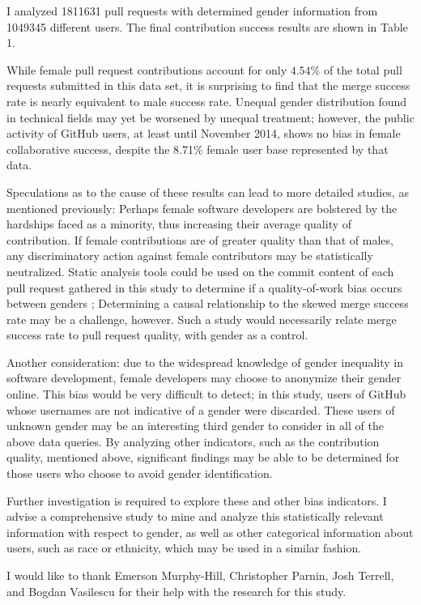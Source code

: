 \documentclass{sigplanconf}
\begin{document}
I analyzed \num{1811631} pull requests with determined gender information from
\num{1049345} different users. The final contribution success results are shown in Table 1.

While female pull request contributions account for only $4.54\%$ of the total pull
requests submitted in this data set, it is surprising to find that the merge
success rate is nearly equivalent to male success rate. Unequal gender
distribution found in technical fields may yet be worsened by unequal treatment;
however, the public activity of GitHub users, at least until November 2014,
shows no bias in female collaborative success, despite the 8.71\% female
user base represented by that data.

Speculations as to the cause of these results can lead to more detailed studies,
as mentioned previously:
Perhaps female software developers are bolstered by the hardships faced as a
minority, thus increasing their average quality of contribution. If female
contributions are of greater quality than that of males, any discriminatory
action against female contributors may be statistically neutralized. Static
analysis tools could be used on the commit content of each pull request gathered
in this study to determine if a quality-of-work bias occurs between genders
\cite{staticanalysis}; Determining a causal relationship to the skewed merge success rate may be a
challenge, however. Such a study would necessarily relate merge success rate to
pull request quality, with gender as a control.

Another consideration: due to the widespread knowledge of gender inequality in software development,
female developers may choose to anonymize their gender online. This bias would
be very difficult to detect; in this study, users of GitHub whose usernames are
not indicative of a gender were discarded. These users of unknown gender may be
an interesting third gender to consider in all of the above data queries. By
analyzing other indicators, such as the contribution quality, mentioned above,
significant findings may be able to be determined for those users who choose to
avoid gender identification.

Further investigation is required to explore these and other bias indicators. I
advise a comprehensive study to mine and analyze this statistically relevant
information with respect to gender, as well as other categorical information
about users, such as race or ethnicity, which may be used in a similar fashion.


\acks
I would like to thank Emerson Murphy-Hill, Christopher Parnin, Josh Terrell, and
Bogdan Vasilescu for their help with the research for this study.






\end{document}
